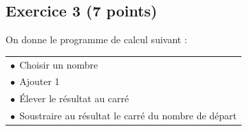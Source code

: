 \documentclass[14 pt, fleqn, pstricks]{extarticle}
\theoremstyle{plain}
\begin{document}
\newpage
\subsection*{Exercice 3 (7 points) }

\medskip

On donne le programme de calcul suivant : 

\begin{center}
\begin{tabularx}{0.6\linewidth}{|X|}\hline
$\bullet~~$Choisir un nombre\\
$\bullet~~$Ajouter 1 \\
$\bullet~~$Élever le résultat au carré\\
$\bullet~~$Soustraire au résultat le carré du nombre de départ\\ \hline
\end{tabularx}
\end{center}
\end{document}
